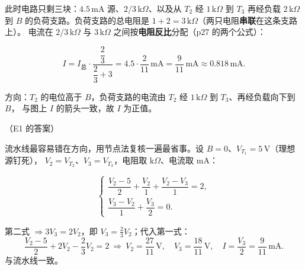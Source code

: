 \documentclass[11pt]{ctexart}
\begin{document}


此时电路只剩三块：$4.5\,\mathrm{mA}$ 源、$2/3\,\mathrm{k}\Omega$、以及从 $T_2$ 经 $1\,\mathrm{k}\Omega$ 到 $T_3$ 再经负载
$2\,\mathrm{k}\Omega$ 到 $B$ 的负荷支路。负荷支路的总电阻是 $1+2=3\,\mathrm{k}\Omega$（两只电阻\textbf{串联}在这条支路上）。
电流在 $2/3\,\mathrm{k}\Omega$ 与 $3\,\mathrm{k}\Omega$ 之间按\textbf{电阻反比}分配（p27 的两个公式）：

\[ I = I_{\text{总}}\cdot\frac{\dfrac{2}{3}}{\dfrac{2}{3}+3}
   = 4.5\cdot\frac{2}{11}\,\mathrm{mA}
   = \frac{9}{11}\,\mathrm{mA}\approx 0.818\,\mathrm{mA} . \]

方向：$T_2$ 的电位高于 $B$，负荷支路的电流由 $T_2$ 经 $1\,\mathrm{k}\Omega$ 到 $T_3$、再经负载向下到 $B$，
与图上 $I$ 的箭头一致，故 $I$ 为正值。

（E1 的答案）


流水线最容易错在方向，用节点法复核一遍最省事。设 $B=0$、$V_{T_1}=5\,\mathrm{V}$（理想源钉死），
$V_2=V_{T_2}$、$V_3=V_{T_3}$，电阻取 $\mathrm{k}\Omega$、电流取 $\mathrm{mA}$：

\[ \begin{cases}
\dfrac{V_2-5}{2}+\dfrac{V_2}{1}+\dfrac{V_2-V_3}{1}=2,\\[4pt]
\dfrac{V_3-V_2}{1}+\dfrac{V_3}{2}=0 .
\end{cases} \]

第二式 $\Rightarrow 3V_3=2V_2$，即 $V_3=\tfrac{2}{3}V_2$；代入第一式：
\[ \frac{V_2-5}{2}+2V_2-\frac{2}{3}V_2=2 \ \Longrightarrow\ V_2=\frac{27}{11}\,\mathrm{V},\quad
V_3=\frac{18}{11}\,\mathrm{V},\quad I=\frac{V_3}{2}=\frac{9}{11}\,\mathrm{mA}. \]
与流水线一致。


\end{document}
